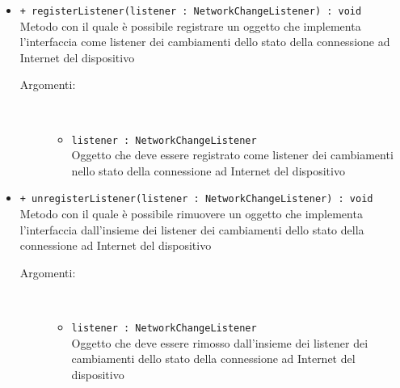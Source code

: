 \documentclass[../Tesi.tex]{subfiles}
\begin{document}
\begin{description}
\begin{itemize}
				\item \texttt{+ registerListener(listener : NetworkChangeListener) : void}\\
				Metodo con il quale è possibile registrare un oggetto che implementa l'interfaccia  come listener dei cambiamenti dello stato della connessione ad Internet del dispositivo
				\begin{description}
					\item[Argomenti:] \
					\begin{itemize}
						\item \texttt{listener : NetworkChangeListener}\\
						Oggetto che deve essere registrato come listener dei cambiamenti nello stato della connessione ad Internet del dispositivo
					\end{itemize}
				\end{description}

				\item \texttt{+ unregisterListener(listener : NetworkChangeListener) : void}\\
				Metodo con il quale è possibile rimuovere un oggetto che implementa l'interfaccia  dall'insieme dei listener dei cambiamenti dello stato della connessione ad Internet del dispositivo
				\begin{description}
					\item[Argomenti:] \
					\begin{itemize}
						\item \texttt{listener : NetworkChangeListener}\\
						Oggetto che deve essere rimosso dall'insieme dei listener dei cambiamenti dello stato della connessione ad Internet del dispositivo
					\end{itemize}
				\end{description}
			\end{itemize}
		\end{description}
\end{document}
